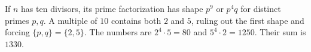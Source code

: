 If $n$ has ten divisors, its prime factorization has shape $p^9$ or $p^4q$ for distinct primes $p,q$. A multiple of $10$ contains both $2$ and $5$, ruling out the first shape and forcing $\{p,q\}=\{2,5\}$. The numbers are $2^4\cdot5=80$ and $5^4\cdot2=1250$. Their sum is $\boxed{1330}$.
